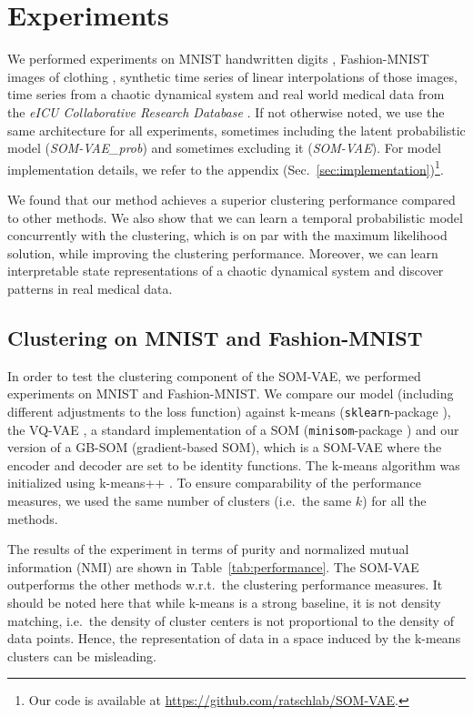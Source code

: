 \section{Experiments}\label{sec:experiments}

We performed experiments on MNIST handwritten digits \citep{LeCun1998}, Fashion-MNIST images of clothing \citep{Xiao2017}, synthetic time series of linear interpolations of those images, time series from a chaotic dynamical system and real world medical data from the \emph{eICU Collaborative Research Database} \citep{Goldberger2000}.
If not otherwise noted, we use the same architecture for all experiments, sometimes including the latent probabilistic model (\emph{SOM-VAE\_prob}) and sometimes excluding it (\emph{SOM-VAE}).
For model implementation details, we refer to the appendix (Sec.~\ref{sec:implementation})\footnote{Our code is available at \url{https://github.com/ratschlab/SOM-VAE}.}.

We found that our method achieves a superior clustering performance compared to other methods.
We also show that we can learn a temporal probabilistic model concurrently with the clustering, which is on par with the maximum likelihood solution, while improving the clustering performance.
Moreover, we can learn interpretable state representations of a chaotic dynamical system and discover patterns in real medical data.


\subsection{Clustering on MNIST and Fashion-MNIST}\label{sec:clustering_benchmark}

In order to test the clustering component of the SOM-VAE, we performed experiments on MNIST and Fashion-MNIST.
We compare our model (including different adjustments to the loss function) against k-means \citep{Lloyd1982} (\texttt{sklearn}-package \citep{Pedregosa2011}), the VQ-VAE \citep{Oord2017}, a standard implementation of a SOM (\texttt{minisom}-package \citep{Vettigli2017}) and our version of a GB-SOM (gradient-based SOM), which is a SOM-VAE where the encoder and decoder are set to be identity functions.
The k-means algorithm was initialized using k-means++ \citep{Arthur2007-rk}.
To ensure comparability of the performance measures, we used the same number of clusters (i.e.\ the same $k$) for all the methods.

The results of the experiment in terms of purity and normalized mutual information (NMI) are shown in Table~\ref{tab:performance}.
The SOM-VAE outperforms the other methods w.r.t.\ the clustering performance measures.
It should be noted here that while k-means is a strong baseline, it is not density matching, i.e.\ the density of cluster centers is not proportional to the density of data points.
Hence, the representation of data in a space induced by the k-means clusters can be misleading.


